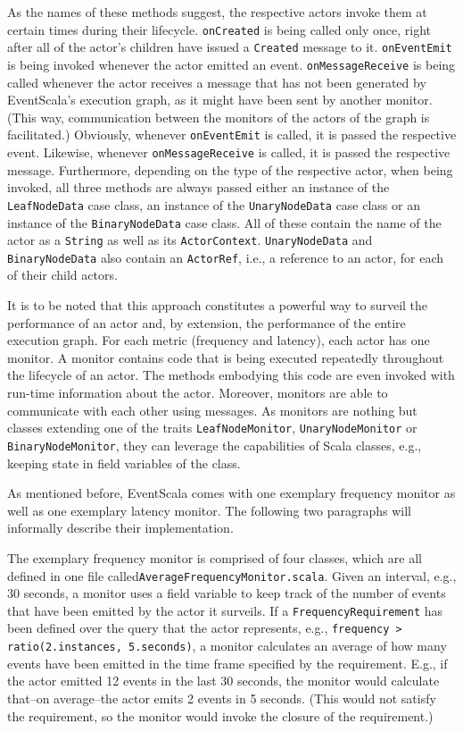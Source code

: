 \documentclass[article, type=bsc, colorback, accentcolor=tud8b, parskip=half, bibliography=totocnumbered]{tudthesis}
\begin{document}
As the names of these methods suggest, the respective actors invoke them at certain times during their lifecycle.
\lstinline{onCreated} is being called only once, right after all of the actor's children have issued a \lstinline{Created} message to it.
\lstinline{onEventEmit} is being invoked whenever the actor emitted an event.
\lstinline{onMessageReceive} is being called whenever the actor receives a message that has not been generated by EventScala's execution graph, as it might have been sent by another monitor.
(This way, communication between the monitors of the actors of the graph is facilitated.)
Obviously, whenever \lstinline{onEventEmit} is called, it is passed the respective event.
Likewise, whenever \lstinline{onMessageReceive} is called, it is passed the respective message.
Furthermore, depending on the type of the respective actor, when being invoked, all three methods are always passed either an instance of the \lstinline{LeafNodeData} case class, an instance of the \lstinline{UnaryNodeData} case class or an instance of the \lstinline{BinaryNodeData} case class.
All of these contain the name of the actor as a \lstinline{String} as well as its \lstinline{ActorContext}.
\lstinline{UnaryNodeData} and \lstinline{BinaryNodeData} also contain an \lstinline{ActorRef}, i.e., a reference to an actor, for each of their child actors.

It is to be noted that this approach constitutes a powerful way to surveil the performance of an actor and, by extension, the performance of the entire execution graph.
For each metric (frequency and latency), each actor has one monitor.
A monitor contains code that is being executed repeatedly throughout the lifecycle of an actor.
The methods embodying this code are even invoked with run-time information about the actor.
Moreover, monitors are able to communicate with each other using messages.
As monitors are nothing but classes extending one of the traits \lstinline{LeafNodeMonitor}, \lstinline{UnaryNodeMonitor} or \lstinline{BinaryNodeMonitor}, they can leverage the capabilities of Scala classes, e.g., keeping state in field variables of the class.

As mentioned before, EventScala comes with one exemplary frequency monitor as well as one exemplary latency monitor.
The following two paragraphs will informally describe their implementation.

The exemplary frequency monitor is comprised of four classes, which are all defined in one file called\newline \lstinline{AverageFrequencyMonitor.scala}.
Given an interval, e.g., 30 seconds, a monitor uses a field variable to keep track of the number of events that have been emitted by the actor it surveils.
If a \lstinline{FrequencyRequirement} has been defined over the query that the actor represents, e.g., \lstinline{frequency > ratio(2.instances, 5.seconds)}, a monitor calculates an average of how many events have been emitted in the time frame specified by the requirement.
E.g., if the actor emitted 12 events in the last 30 seconds, the monitor would calculate that--on average--the actor emits 2 events in 5 seconds.
(This would not satisfy the requirement, so the monitor would invoke the closure of the requirement.)
\end{document}
